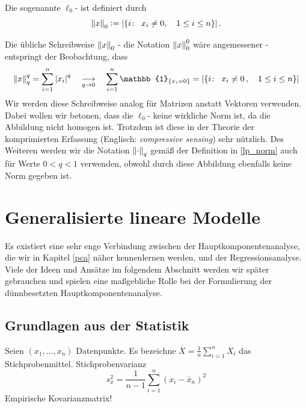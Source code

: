 \begin{defn}
Die sogenannte $\ell_0$- ist definiert durch
$$\left\lVert x \right\rVert_{0} \vcentcolon= \left|\{i \colon \enspace x_i \neq 0 , \quad 1 \leq i \leq n\}\right|.$$
\end{defn}

Die übliche Schreibweise $\left\lVert x \right\rVert_0$ - die Notation $\left\lVert x \right\rVert_{0}^{0}$ wäre angemessener - entspringt der Beobachtung, dass 
$$\norm{x}_{q}^{q} = \sum_{i=1}^{n} \abs{x_i}^q \quad \underset{q \rightarrow 0}{\longrightarrow} \quad \sum_{i=1}^{n} \mathbb{1}_{\{x_i = 0\}} = \left|\{i \colon \enspace x_i \neq 0\, , \quad 1 \leq i \leq n\}\right|$$
Wir werden diese Schreibweise analog für Matrizen anstatt Vektoren verwenden. Dabei wollen wir betonen, dass die $\ell_0$- keine wirkliche Norm ist, da die Abbildung nicht homogen ist. Trotzdem ist diese  in der Theorie der komprimierten Erfassung (Englisch: \textit{compressive sensing}) sehr nützlich. Des Weiteren werden wir die Notation $\left\lVert \cdot \right\rVert_q$ gemäß der Definition in \ref{lp_norm} auch für Werte $0 < q < 1$ verwenden, obwohl durch diese Abbildung ebenfalls keine Norm gegeben ist.


\section{Generalisierte lineare Modelle}
\label{generalized_linear_models}

Es existiert eine sehr enge Verbindung zwischen der Hauptkomponentenanalyse, die wir in Kapitel \ref{pca} näher kennenlernen werden, und der Regressionsanalyse. Viele der Ideen und Ansätze im folgendem Abschnitt werden wir später gebrauchen und spielen eine maßgebliche Rolle bei der Formulierung der dünnbesetzten Hauptkomponentenanalyse.\\

\subsection{Grundlagen aus der Statistik}

Seien $(x_1, \ldots, x_n)$ Datenpunkte.
Es bezeichne
$\overline{X}=\frac{1}{n}\sum _{i=1}^{n}X_{i}$
das Stichprobenmittel.
Stichprobenvarianz
$$s_x^2 = \frac{1}{n-1}\sum_{i=1}^n(x_i - \bar{x}_n)^2$$
Empirische Kovarianzmatrix!

